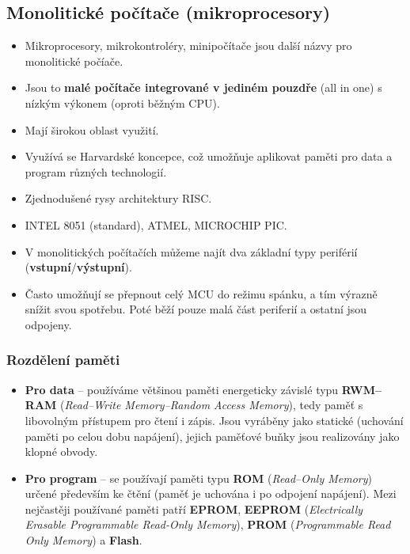 \subsection{Monolitické počítače (mikroprocesory)}
\begin{itemize}
\item Mikroprocesory, mikrokontroléry, minipočítače jsou další názvy pro monolitické počíače.
\item Jsou to \textbf{malé počítače integrované v jediném pouzdře} (all in one) s nízkým výkonem (oproti běžným CPU).
\item Mají širokou oblast využití.
\item Využívá se Harvardské koncepce, což umožňuje aplikovat paměti pro data a program různých technologií.
\item Zjednodušené rysy architektury RISC.
\item INTEL 8051 (standard), ATMEL, MICROCHIP PIC.
\item V monolitických počítačích můžeme najít dva základní typy periférií (\textbf{vstupní}/\textbf{výstupní}).
\item Často umožňují se přepnout celý MCU do režimu spánku, a tím výrazně snížit svou spotřebu. Poté běží pouze malá část periferií a ostatní jsou odpojeny.
\end{itemize}
 
 \subsubsection{Rozdělení paměti}
\begin{itemize}
		\item \textbf{Pro data} -- používáme většinou paměti energeticky závislé typu \textbf{RWM--RAM} (\textit{Read--Write Memory--Random Access Memory}), tedy paměť s libovolným přístupem pro čtení i zápis. Jsou vyráběny jako statické (uchování paměti po celou dobu napájení), jejich paměťové buňky jsou realizovány jako klopné obvody. 
		\item \textbf{Pro program} -- se používají paměti typu \textbf{ROM} (\textit{Read--Only Memory}) určené především ke čtění (paměť je uchována i po odpojení napájení). Mezi nejčastěji používané paměti patří \textbf{EPROM}, \textbf{EEPROM} (\textit{Electrically Erasable Programmable Read-Only Memory}), \textbf{PROM} (\textit{Programmable Read Only Memory}) a \textbf{Flash}.
\end{itemize}

